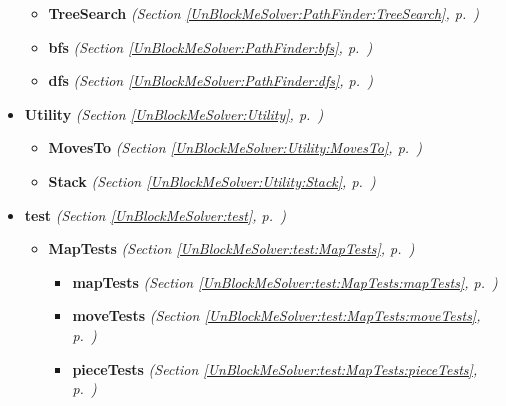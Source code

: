 \begin{itemize}
\begin{itemize}
    \item \textbf{TreeSearch}
  \textit{(Section \ref{UnBlockMeSolver:PathFinder:TreeSearch}, p.~\pageref{UnBlockMeSolver:PathFinder:TreeSearch})}

    \item \textbf{bfs}
  \textit{(Section \ref{UnBlockMeSolver:PathFinder:bfs}, p.~\pageref{UnBlockMeSolver:PathFinder:bfs})}

    \item \textbf{dfs}
  \textit{(Section \ref{UnBlockMeSolver:PathFinder:dfs}, p.~\pageref{UnBlockMeSolver:PathFinder:dfs})}

  \end{itemize}
\item \textbf{Utility}
  \textit{(Section \ref{UnBlockMeSolver:Utility}, p.~\pageref{UnBlockMeSolver:Utility})}

  \begin{itemize}
\setlength{\parskip}{0ex}
    \item \textbf{MovesTo}
  \textit{(Section \ref{UnBlockMeSolver:Utility:MovesTo}, p.~\pageref{UnBlockMeSolver:Utility:MovesTo})}

    \item \textbf{Stack}
  \textit{(Section \ref{UnBlockMeSolver:Utility:Stack}, p.~\pageref{UnBlockMeSolver:Utility:Stack})}

  \end{itemize}
\item \textbf{test}
  \textit{(Section \ref{UnBlockMeSolver:test}, p.~\pageref{UnBlockMeSolver:test})}

  \begin{itemize}
\setlength{\parskip}{0ex}
    \item \textbf{MapTests}
  \textit{(Section \ref{UnBlockMeSolver:test:MapTests}, p.~\pageref{UnBlockMeSolver:test:MapTests})}

      \begin{itemize}
    \setlength{\parskip}{0ex}
        \item \textbf{mapTests}
  \textit{(Section \ref{UnBlockMeSolver:test:MapTests:mapTests}, p.~\pageref{UnBlockMeSolver:test:MapTests:mapTests})}

        \item \textbf{moveTests}
  \textit{(Section \ref{UnBlockMeSolver:test:MapTests:moveTests}, p.~\pageref{UnBlockMeSolver:test:MapTests:moveTests})}

        \item \textbf{pieceTests}
  \textit{(Section \ref{UnBlockMeSolver:test:MapTests:pieceTests}, p.~\pageref{UnBlockMeSolver:test:MapTests:pieceTests})}


\end{itemize}
\end{itemize}
\end{itemize}
